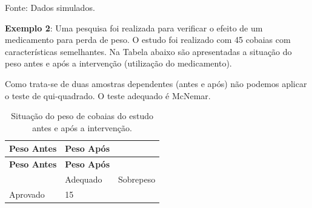 \documentclass[12pt,brazil,oneside]{book}
\begin{document}
Fonte: Dados simulados.

\textbf{Exemplo 2}: Uma pesquisa foi realizada para verificar o efeito
de um medicamento para perda de peso. O estudo foi realizado com 45
cobaias com características semelhantes. Na Tabela abaixo são
apresentadas a situação do peso antes e após a intervenção (utilização
do medicamento).

Como trata-se de duas amostras dependentes (antes e após) não podemos
aplicar o teste de qui-quadrado. O teste adequado é McNemar.

\begin{longtable}[]{@{}lll@{}}
\caption{\label{tab:sitcob}Situação do peso de cobaias do estudo antes e
após a intervenção.}\tabularnewline
\toprule
\begin{minipage}[b]{0.35\columnwidth}\raggedright
\textbf{Peso Antes}\strut
\end{minipage} & \begin{minipage}[b]{0.25\columnwidth}\raggedright
\textbf{Peso Após}\strut
\end{minipage} & \begin{minipage}[b]{0.22\columnwidth}\raggedright
\strut
\end{minipage}\tabularnewline
\midrule
\endfirsthead
\toprule
\begin{minipage}[b]{0.35\columnwidth}\raggedright
\textbf{Peso Antes}\strut
\end{minipage} & \begin{minipage}[b]{0.25\columnwidth}\raggedright
\textbf{Peso Após}\strut
\end{minipage} & \begin{minipage}[b]{0.22\columnwidth}\raggedright
\strut
\end{minipage}\tabularnewline
\midrule
\endhead
\begin{minipage}[t]{0.35\columnwidth}\raggedright
\strut
\end{minipage} & \begin{minipage}[t]{0.25\columnwidth}\raggedright
Adequado\strut
\end{minipage} & \begin{minipage}[t]{0.22\columnwidth}\raggedright
Sobrepeso\strut
\end{minipage}\tabularnewline
\begin{minipage}[t]{0.35\columnwidth}\raggedright
Aprovado\strut
\end{minipage} & \begin{minipage}[t]{0.25\columnwidth}\raggedright
15\strut
\end{minipage} & \begin{minipage}[t]{0.22\columnwidth}\raggedright

\end{minipage}
\end{longtable}
\end{document}
